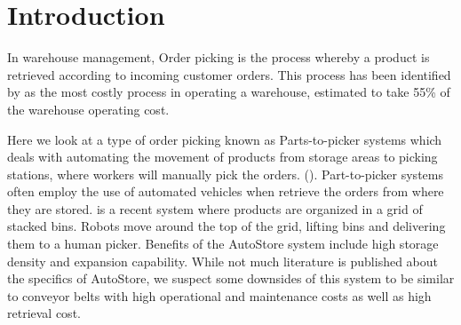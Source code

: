 \documentclass[a4paper,11pt]{article}
\begin{document}
\section{Introduction}


In warehouse management, Order picking is the process whereby a product is retrieved according to incoming customer orders. This process has been identified by \cite{de2007design} as the most costly process in operating a warehouse, estimated to take 55\% of the warehouse operating cost.


Here we look at a type of order picking known as Parts-to-picker systems which deals with automating the movement of products from storage areas to picking stations, where workers will manually pick the orders. (\cite{wurman2008coordinating}). Part-to-picker systems often employ the use of automated vehicles when retrieve the orders from where they are stored. \cite{introduction2015autostore} is a recent system where products are organized in a grid of stacked bins. Robots move around the top of the grid, lifting bins and delivering them to a human picker. Benefits of the AutoStore system include high storage density and expansion capability. While not much literature is published about the specifics of AutoStore, we suspect some downsides of this system to be similar to conveyor belts with high operational and maintenance costs as well as high retrieval cost.
\end{document}
